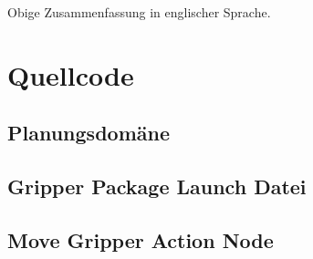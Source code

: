 Obige Zusammenfassung in englischer Sprache.

\newpage
{} %
\listoffigures

\newpage
{} %
\listoftables
\newpage

\setlength{\parskip}{0.5em} 




\clearpage
{}  
    \setcounter{page}{1}
\lhead{\nouppercase{\leftmark}}







%
\clearpage
\lhead{}
\printbibliography
{}


\clearpage
\appendix
\section{Quellcode} %
\subsection{Planungsdomäne}

\subsection{Gripper Package Launch Datei}

\subsection{Move Gripper Action Node}



